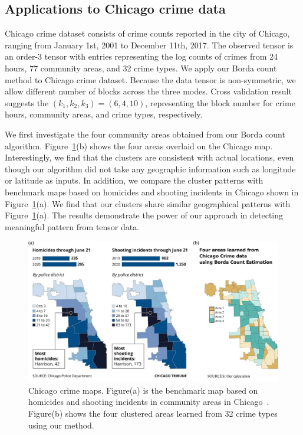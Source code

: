 \documentclass[12pt]{article}
\theoremstyle{definition}
\begin{document}
\subsection{Applications to Chicago crime data}
Chicago crime dataset consists of crime counts reported in the city of Chicago, ranging from January 1st, 2001 to December 11th, 2017. The observed tensor is an order-3 tensor with entries representing the log counts of crimes from 24 hours, 77 community areas, and 32 crime types. We apply our Borda count method to Chicago crime dataset. Because the data tensor is non-symmetric, we allow different number of blocks across the three modes. Cross validation result suggests the $(k_1,k_2,k_3)=(6,4,10)$, representing the block number for crime hours, community areas, and crime types, respectively.

We first investigate the four community areas obtained from our Borda count algorithm.  Figure~\ref{fig:area}(b) shows the four areas overlaid on the Chicago map. Interestingly, we find that the clusters are consistent with actual locations, even though our algorithm did not take any geographic information such as longitude or latitude as inputs. In addition, we compare the cluster patterns with benchmark maps based on homicides and shooting incidents in Chicago shown in Figure~\ref{fig:area}(a). We find that our clusters share similar geographical patterns with Figure~\ref{fig:area}(a). The results demonstrate the power of our approach in detecting meaningful pattern from tensor data. 
\begin{figure}[t!]
    \centering
    \includegraphics[width = \textwidth]{figure/crimecompare.pdf}
    \caption{Chicago crime maps. Figure(a) is the benchmark map based on homicides and shooting incidents in community areas in Chicago~\citep{Jeremy.2020}. Figure(b) shows the four clustered areas learned from 32 crime types using our method.}
    \label{fig:area}
\end{figure}
\end{document}
